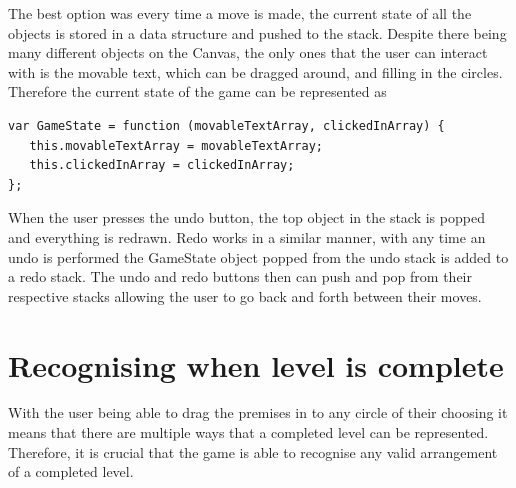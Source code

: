 \documentclass[12pt,a4paper]{report}
\begin{document}
The best option was every time a move is made, the current state of all the objects is stored in a data structure and pushed to the stack. Despite there being many different objects on the Canvas, the only ones that the user can interact with is the movable text, which can be dragged around, and filling in the circles. Therefore the current state of the game can be represented as
 
\begin{minipage}{\linewidth}
\begin{lstlisting}
var GameState = function (movableTextArray, clickedInArray) {
   this.movableTextArray = movableTextArray;
   this.clickedInArray = clickedInArray;
};
\end{lstlisting}
\end{minipage}

 When the user presses the undo button, the top object in the stack is popped and everything is redrawn. 
Redo works in a similar manner, with any time an undo is performed the GameState object popped from the undo stack is added to a redo stack. The undo and redo buttons then can push and pop from their respective stacks allowing the user to go back and forth between their moves.

\section{Recognising when level is complete}
With the user being able to drag the premises in to any circle of their choosing it means that there are multiple ways that a completed level can be represented.
Therefore, it is crucial that the game is able to recognise any valid arrangement of a completed level.
\end{document}
